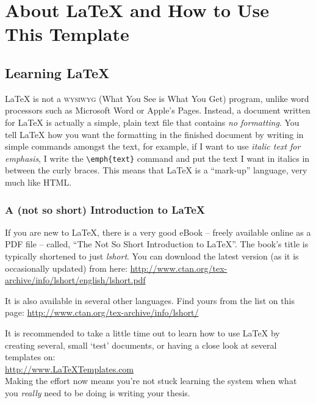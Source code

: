 
\chapter{About \LaTeX{} and How to Use This Template} %

\label{chap:Chapter2} %


\section{Learning \LaTeX{}}

\LaTeX{} is not a \textsc{wysiwyg} (What You See is What You Get) program, unlike word processors such as Microsoft Word or Apple's Pages. Instead, a document written for \LaTeX{} is actually a simple, plain text file that contains \emph{no formatting}. You tell \LaTeX{} how you want the formatting in the finished document by writing in simple commands amongst the text, for example, if I want to use \emph{italic text for emphasis}, I write the \verb|\emph{text}| command and put the text I want in italics in between the curly braces. This means that \LaTeX{} is a \enquote{mark-up} language, very much like HTML.

\subsection{A (not so short) Introduction to \LaTeX{}}

If you are new to \LaTeX{}, there is a very good eBook -- freely available online as a PDF file -- called, \enquote{The Not So Short Introduction to \LaTeX{}}. The book's title is typically shortened to just \emph{lshort}. You can download the latest version (as it is occasionally updated) from here:
\url{http://www.ctan.org/tex-archive/info/lshort/english/lshort.pdf}

It is also available in several other languages. Find yours from the list on this page: \url{http://www.ctan.org/tex-archive/info/lshort/}

It is recommended to take a little time out to learn how to use \LaTeX{} by creating several, small `test' documents, or having a close look at several templates on:\\ 
\url{http://www.LaTeXTemplates.com}\\ 
Making the effort now means you're not stuck learning the system when what you \emph{really} need to be doing is writing your thesis.

